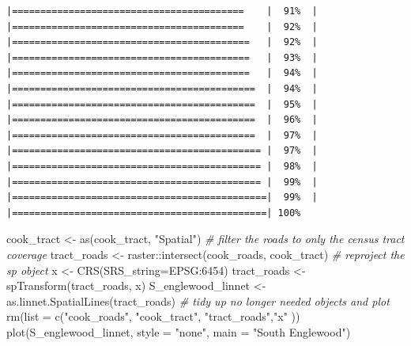 \documentclass[
  krantz2]{krantz}
\makeatletter
\newenvironment{Shaded}{\begin{snugshade}}{\end{snugshade}}
\newcommand{\AttributeTok}[1]{\textcolor[rgb]{0.61,0.61,0.61}{#1}}
\newcommand{\CommentTok}[1]{\textcolor[rgb]{0.37,0.37,0.37}{\textit{#1}}}
\newcommand{\FunctionTok}[1]{\textcolor[rgb]{0,0,0}{#1}}
\newcommand{\NormalTok}[1]{#1}
\newcommand{\OtherTok}[1]{\textcolor[rgb]{0.37,0.37,0.37}{#1}}
\newcommand{\SpecialCharTok}[1]{\textcolor[rgb]{0,0,0}{#1}}
\newcommand{\StringTok}[1]{\textcolor[rgb]{0.5,0.5,0.5}{#1}}
\newenvironment{kframe}{%
\medskip{}
\setlength{\fboxsep}{.8em}
 \def\at@end@of@kframe{}%
 \ifinner\ifhmode%
  \def\at@end@of@kframe{\end{minipage}}%
  \begin{minipage}{\columnwidth}%
 \fi\fi%
 \def\FrameCommand##1{\hskip\@totalleftmargin \hskip-\fboxsep
 \colorbox{shadecolor}{##1}\hskip-\fboxsep
     \hskip-\linewidth \hskip-\@totalleftmargin \hskip\columnwidth}%
 \MakeFramed {\advance\hsize-\width
   \@totalleftmargin\z@ \linewidth\hsize
   \@setminipage}}%
 {\par\unskip\endMakeFramed%
 \at@end@of@kframe}
\renewenvironment{Shaded}{\begin{kframe}}{\end{kframe}}
\makeatother
\begin{document}
\begin{verbatim}
|=========================================    |  91%  |                                                     |=========================================    |  92%  |                                                     |==========================================   |  92%  |                                                     |==========================================   |  93%  |                                                     |==========================================   |  94%  |                                                     |===========================================  |  94%  |                                                     |===========================================  |  95%  |                                                     |===========================================  |  96%  |                                                     |===========================================  |  97%  |                                                     |============================================ |  97%  |                                                     |============================================ |  98%  |                                                     |============================================ |  99%  |                                                     |=============================================|  99%  |                                                     |=============================================| 100%
\end{verbatim}

\begin{Shaded}
\begin{Highlighting}[]
\NormalTok{cook\_tract }\OtherTok{\textless{}{-}} \FunctionTok{as}\NormalTok{(cook\_tract, }\StringTok{"Spatial"}\NormalTok{)}
\CommentTok{\# filter the roads to only the census tract coverage}
\NormalTok{tract\_roads }\OtherTok{\textless{}{-}}\NormalTok{ raster}\SpecialCharTok{::}\FunctionTok{intersect}\NormalTok{(cook\_roads, cook\_tract)}
\CommentTok{\# reproject the sp object}
\NormalTok{x }\OtherTok{\textless{}{-}} \FunctionTok{CRS}\NormalTok{(}\AttributeTok{SRS\_string=}\StringTok{\textquotesingle{}EPSG:6454\textquotesingle{}}\NormalTok{)}
\NormalTok{tract\_roads }\OtherTok{\textless{}{-}} \FunctionTok{spTransform}\NormalTok{(tract\_roads, x)}
\NormalTok{S\_englewood\_linnet }\OtherTok{\textless{}{-}} \FunctionTok{as.linnet.SpatialLines}\NormalTok{(tract\_roads)}
\CommentTok{\# tidy up no longer needed objects and plot}
\FunctionTok{rm}\NormalTok{(}\AttributeTok{list =} \FunctionTok{c}\NormalTok{(}\StringTok{"cook\_roads"}\NormalTok{, }\StringTok{"cook\_tract"}\NormalTok{, }\StringTok{"tract\_roads"}\NormalTok{,}\StringTok{"x"}\NormalTok{ ))}
\FunctionTok{plot}\NormalTok{(S\_englewood\_linnet, }\AttributeTok{style =} \StringTok{"none"}\NormalTok{, }\AttributeTok{main =} \StringTok{"South Englewood"}\NormalTok{)}
\end{Highlighting}
\end{Shaded}
\end{document}
